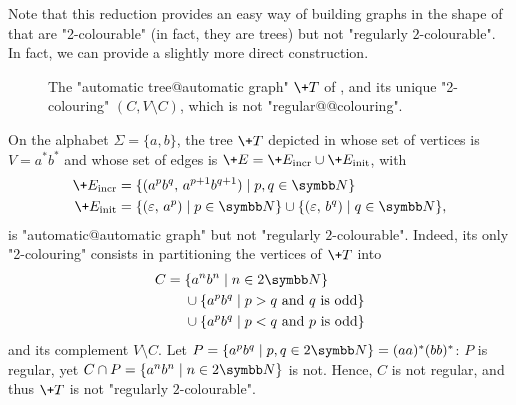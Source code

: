 Note that this reduction provides an easy way of building
graphs in the shape of  that are "2-colourable" (in fact, they are trees) but not "regularly $2$-colourable". In fact, we can provide a slightly more
direct construction.

\begin{figure}
    \centering
    \begin{tikzpicture}
        
    \end{tikzpicture}
    \caption{
        \label{fig:tree-not-2reg-colour}
        The "automatic tree@automatic graph" $\+T$ of ,
        and its unique "2-colouring" $(C, V\setminus C)$, which is not "regular@@colouring".
    }
\end{figure}
\begin{example}
    \AP\label{ex:tree-not-2-reg-colourable}
    On the alphabet $\Sigma = \{a,b\}$, the tree $\+T$ depicted in  whose set of vertices is $V = a^*b^*$ and whose set 
    of edges is $\+E = \+E_{\mathrm{incr}} \cup \+E_{\mathrm{init}}$, with 
    \begin{align*}
        \+E_{\mathrm{incr}} & = \{(a^pb^q,\, a^{p+1}b^{q+1}) \mid p,q \in \N\} \\
        \+E_{\mathrm{init}} & = \{(\varepsilon,\, a^p) \mid p \in \N\} \cup \{(\varepsilon,\, b^q) \mid q \in \N\}, 
    \end{align*}    
    is "automatic@automatic graph" but not "regularly $2$-colourable".
    Indeed, its only "2-colouring"
    consists in partitioning the vertices of $\+T$ into
    \begin{align*}
        C =\;& \{a^n b^n \mid n \in 2\N\} \\
            & \cup \{a^p b^q \mid p > q \text{ and $q$ is odd}\} \\
            & \cup \{a^p b^q \mid p < q \text{ and $p$ is odd}\}
    \end{align*}
    and its complement $V \setminus C$.
    Let $P = \{a^p b^q \mid p, q \in 2\N\} = (aa)^*(bb)^*$:
    $P$ is regular, yet $C \cap P = \{a^n b^n \mid n \in 2\N\}$ is not.
    Hence, $C$ is not regular, and thus $\+T$ is not "regularly $2$-colourable".
\end{example}